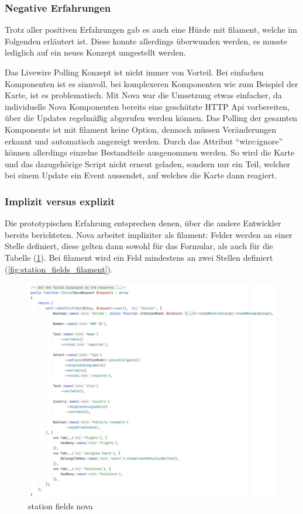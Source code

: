 \subsubsection{Negative Erfahrungen}
Trotz aller positiven Erfahrungen gab es auch eine Hürde mit filament, welche im Folgenden erläutert ist.
Diese konnte allerdings überwunden werden, es musste lediglich auf ein neues Konzept umgestellt werden.

Das Livewire Polling Konzept ist nicht immer von Vorteil.
Bei einfachen Komponenten ist es sinnvoll, bei komplexeren Komponenten wie zum Beispiel der Karte, ist es problematisch.
Mit Nova war die Umsetzung etwas einfacher, da individuelle Nova Komponenten bereits eine geschützte HTTP Api vorbereiten, über die Updates regelmäßig abgerufen werden können.
Das Polling der gesamten Komponente ist mit filament keine Option, dennoch müssen Veränderungen erkannt und automatisch angezeigt werden.
Durch das Attribut \enquote{wire:ignore} können allerdings einzelne Bestandteile ausgenommen werden.
So wird die Karte und das dazugehörige Script nicht erneut geladen, sondern nur ein Teil, welcher bei einem Update ein Event aussendet, auf welches die Karte dann reagiert.

\newpage

\subsubsection{Implizit versus explizit}
Die prototypischen Erfahrung entsprechen denen, über die andere Entwickler\cite{reddit-laravel-nova-vs-filament} bereits berichteten.
Nova arbeitet impliziter als filament:
Felder werden an einer Stelle definiert, diese gelten dann sowohl für das Formular, als auch für die Tabelle (\ref{fig:station_fields_nova}).
Bei filament wird ein Feld mindestens an zwei Stellen definiert (\ref{fig:station_fields_filament}).

\begin{figure}[h!]
    \centering
    \caption{station fields nova}
    \label{fig:station_fields_nova}
    \includegraphics[scale=0.50]{assets/station_fields_nova}
\end{figure}

